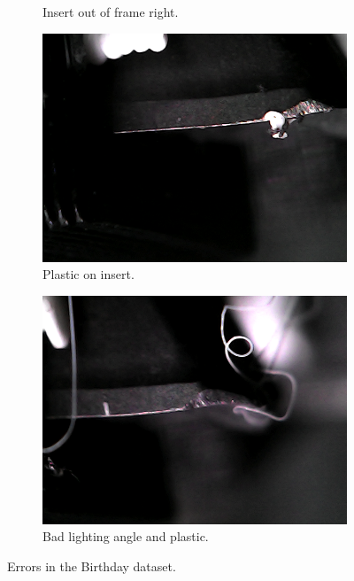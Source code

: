 \begin{figure}[hbtp]
\begin{subfigure}{0.24\textwidth}
		\caption{Insert out of frame right.}
		\label{fig:impl:dataset:birthday:error:right}
	\end{subfigure}
	\hspace*{\fill}
	\begin{subfigure}{0.24\textwidth}
		\includegraphics[width=\linewidth, keepaspectratio=true]{fig/Vision/Dataset/automated_datasets/2_created_datasets/1_Birthday_dataset/error/b_003_p_007_l_000_nb.png}
		\caption{Plastic on insert.}
		\label{fig:impl:dataset:birthday:error:plastic}
	\end{subfigure}
	\hspace*{\fill}
	\begin{subfigure}{0.24\textwidth}
		\includegraphics[width=\linewidth, keepaspectratio=true]{fig/Vision/Dataset/automated_datasets/2_created_datasets/1_Birthday_dataset/error/b_005_p_006_l_000_b.png} 
		\caption{Bad lighting angle and plastic.}
		\label{fig:impl:dataset:birthday:error:light}
	\end{subfigure}
	\caption{Errors in the Birthday dataset.}
\label{fig:dataset:birthday:error}
\end{figure}


